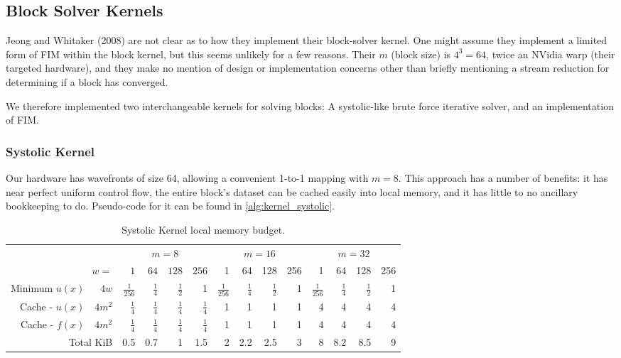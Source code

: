 \documentclass[11pt]{article}       %
\begin{document}
\subsection{Block Solver Kernels} \label{sec:block_kernels}

Jeong and Whitaker (2008)\cite{jeong2008fast} are not clear as to how they implement their block-solver kernel. One might assume they implement a limited form of FIM within the block kernel, but this seems unlikely for a few reasons. Their $m$ (block size) is $4^3 = 64$, twice an NVidia warp (their targeted hardware), and they make no mention of design or implementation concerns other than briefly mentioning a stream reduction for determining if a block has converged.

We therefore implemented two interchangeable kernels for solving blocks: A systolic-like brute force iterative solver, and an implementation of FIM.


\subsubsection{Systolic Kernel}\label{sec:kernel_systolic}

Our hardware has wavefronts of size 64, allowing a convenient 1-to-1 mapping with $m = 8$. This approach has a number of benefits: it has near perfect uniform control flow, the entire block's dataset can be cached easily into local memory, and it has little to no ancillary bookkeeping to do. Pseudo-code for it can be found in \autoref{alg:kernel_systolic}.

\begin{table}
	\centering
	\begin{tabular}{|r r|r|r|r|r|r|r|r|r|r|r|r|r|}
		\cline{3-14}
		\multicolumn{2}{c|}{} & \multicolumn{4}{c|}{$m=8$}                       & \multicolumn{4}{c|}{$m=16$}       & \multicolumn{4}{c|}{$m=32$}     \\ \cline{3-14} 
		\multicolumn{2}{r|}{$w=$} 			& $1$       		& $64$   & $128$    & $256$    & 1           & 64    & 128  & 256  & 1           & 64    & 128 & 256 \\ \hline
		Minimum $u(x)$       & $4w$	&$\frac{1}{256}$	&$\frac{1}{4}$	&$\frac{1}{2}$	&1	&$\frac{1}{256}$	&$\frac{1}{4}$	&$\frac{1}{2}$	&1	&$\frac{1}{256}$	&$\frac{1}{4}$	&$\frac{1}{2}$	&1\\ \hline
		Cache - $u(x)$ & $4m^2$	&$\frac{1}{4}$	&$\frac{1}{4}$	&$\frac{1}{4}$	&$\frac{1}{4}$	&1	&1	&1	&1	&4	&4	&4	&4\\ \hline
		Cache - $f(x)$ & $4m^2$	&$\frac{1}{4}$	&$\frac{1}{4}$	&$\frac{1}{4}$	&$\frac{1}{4}$	&1	&1	&1	&1	&4	&4	&4	&4\\ \hline
		\multicolumn{2}{|r|}{Total KiB}	&0.5	&0.7	&1	&1.5	&2	&2.2	&2.5	&3	&8	&8.2	&8.5	&9\\ \hline
	\end{tabular}
	\caption{Systolic Kernel local memory budget.\footnotemark }
	\label{tab:kernel_mem_budget_systolic}
\end{table}
\end{document}

